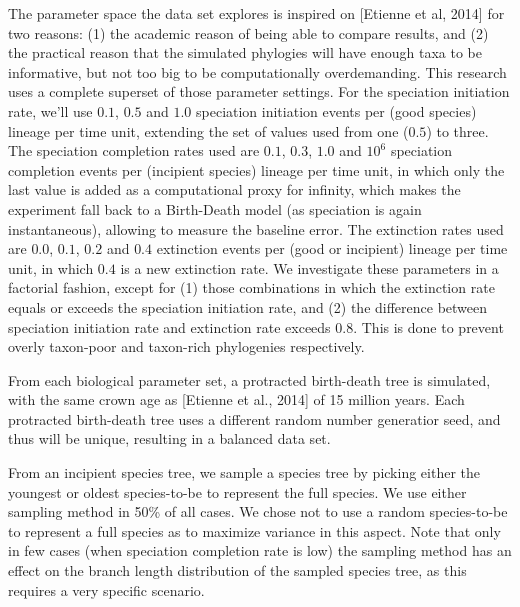 \documentclass{article}
\begin{document}
The parameter space the data set explores is inspired on 
[Etienne et al, 2014] for two reasons: (1) the academic
reason of being able to compare results, and (2) the practical
reason that the simulated phylogies will have enough taxa to
be informative, but not too big to be computationally overdemanding.
This research uses a complete superset of those parameter settings.
For the speciation initiation rate, we'll use $0.1$, $0.5$ and $1.0$ 
speciation initiation events per (good species) lineage per time unit, 
extending the set of
values used from one ($0.5$) to three. 
The speciation completion
rates used are $0.1$, $0.3$, $1.0$ and $10^6$ speciation completion
events per (incipient species) lineage per time unit, in which only
the last value is added as a computational proxy for infinity, which
makes the experiment fall back to a Birth-Death model (as speciation
is again instantaneous), allowing to measure the baseline error.
The extinction rates used are $0.0$, $0.1$, $0.2$ and $0.4$ 
extinction events per (good or incipient) lineage per time unit,
in which $0.4$ is a new extinction rate.
We investigate these parameters in a factorial fashion, except for
(1) those combinations in which the extinction rate equals or exceeds
the speciation initiation rate, and (2) the difference between
speciation initiation rate and extinction rate exceeds $0.8$. This is
done to prevent overly taxon-poor and taxon-rich phylogenies respectively.

From each biological parameter set, a protracted birth-death tree is simulated,
with the same crown age as [Etienne et al., 2014] of 15 million years. 
Each protracted birth-death tree uses a different random number
generatior seed, and thus will be unique, resulting in a balanced 
data set. 

From an incipient species tree, we sample a species tree
by picking either the youngest or oldest
species-to-be to represent the full species.
We use either sampling method in 50\% of all cases. We chose not to use
a random species-to-be to represent a full species as to maximize variance
in this aspect. Note that only in few cases (when speciation completion rate
is low) the sampling method has an effect on the branch length distribution
of the sampled species tree, as this requires a very specific scenario.
\end{document}
